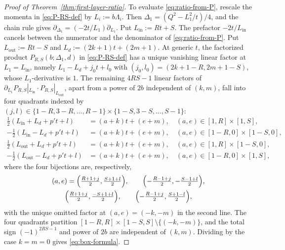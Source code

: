 \documentclass[twoside,10pt]{article}
\numberwithin{equation}{section}
\theoremstyle{slbody}
\theoremstyle{definition}
\theoremstyle{remark}
\begin{document}
\begin{proof}[Proof of Theorem~\ref{thm:first-layer-ratio}]
To evaluate \eqref{eq:ratio-from-P}, rescale the momenta in
\eqref{eq:P-RS-def} by \(L_i:=b\Lambda_i\).  Then
\(\Delta_1=(Q^2-L_1^2/t)/4\), and the chain rule gives
\(\partial_{\Delta_1}=(-2t/L_1)\partial_{L_1}\).  Put \(L_{\mathrm{in}}:=Rt+S\).
The prefactor \(-2t/L_{\mathrm{in}}\) cancels between the numerator and the
denominator of \eqref{eq:ratio-from-P}.  Put
\(L_{\mathrm{out}}:=Rt-S\) and \(L_d:=(2k+1)t+(2m+1)\).  At generic \(t\), the
factorized product \(P_{R,S}(b;\Delta_1,d)\) in \eqref{eq:P-RS-def} has a
unique vanishing linear factor at \(L_1=L_{\mathrm{in}}\), namely
\(L_1-L_d+j_0t+l_0\) with \((j_0,l_0)=(2k+1-R,2m+1-S)\), whose
\(L_1\)-derivative is \(1\).  The remaining \(4RS-1\) linear factors of
\(\partial_{L_1}P_{R,S}|_{L_{\mathrm{in}}}\cdot P_{R,S}|_{L_{\mathrm{out}}}\),
apart from a power of \(2b\) independent of \((k,m)\), fall into four
quadrants indexed by
\((j,l)\in\{1-R,3-R,\ldots,R-1\}\times\{1-S,3-S,\ldots,S-1\}\):
\begin{align*}
 \tfrac{1}{2}(L_{\mathrm{in}}+L_d+p't+l)
 &=(a+k)t+(e+m),
 \quad (a,e)\in[1,R]\times[1,S],\\
 -\tfrac{1}{2}(L_{\mathrm{in}}-L_d+p't+l)
 &=(a+k)t+(e+m),
 \quad (a,e)\in[1-R,0]\times[1-S,0],\\
 \tfrac{1}{2}(L_{\mathrm{out}}+L_d+p't+l)
 &=(a+k)t+(e+m),
 \quad (a,e)\in[1,R]\times[1-S,0],\\
 -\tfrac{1}{2}(L_{\mathrm{out}}-L_d+p't+l)
 &=(a+k)t+(e+m),
 \quad (a,e)\in[1-R,0]\times[1,S],
\end{align*}
where the four bijections are, respectively,
\begin{gather*}
 (a,e)=\Bigl(\tfrac{R+1+j}{2},\tfrac{S+1+l}{2}\Bigr),\qquad
 \Bigl(-\tfrac{R-1+j}{2},-\tfrac{S-1+l}{2}\Bigr),\\
 \Bigl(\tfrac{R+1+j}{2},\tfrac{-S+1+l}{2}\Bigr),\qquad
 \Bigl(-\tfrac{R-1+j}{2},\tfrac{S+1-l}{2}\Bigr),
\end{gather*}
with the unique omitted factor at \((a,e)=(-k,-m)\) in the second line.  The
four quadrants partition \([1-R,R]\times[1-S,S]\setminus\{(-k,-m)\}\), and the
total sign \((-1)^{2RS-1}\) and power of \(2b\) are independent of \((k,m)\).
Dividing by the case \(k=m=0\) gives \eqref{eq:box-formula}.


\end{proof}
\end{document}

